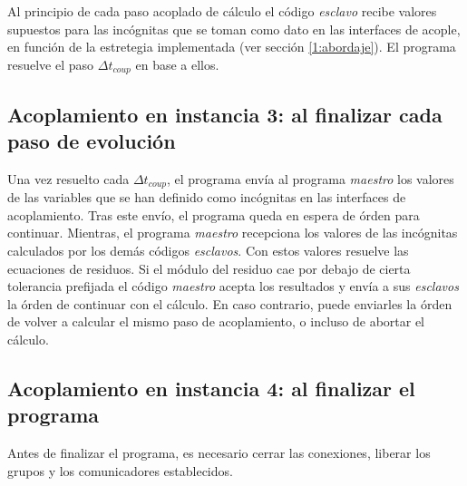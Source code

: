 Al principio de cada paso acoplado de cálculo el código \textit{esclavo} recibe valores supuestos para las incógnitas que se toman como dato en las interfaces de acople,
en función de la estretegia implementada (ver sección \ref{1:abordaje}).
El programa resuelve el paso $\Delta t_{coup}$ en base a ellos.

\subsection*{Acoplamiento en instancia 3: al finalizar cada paso de evolución}

Una vez resuelto cada $\Delta t_{coup}$, el programa envía al programa \textit{maestro} los valores de las variables que se han definido como incógnitas en las interfaces de acoplamiento.
Tras este envío, el programa queda en espera de órden para continuar.
Mientras, el programa \textit{maestro} recepciona los valores de las incógnitas calculados por los demás códigos \textit{esclavos}.
Con estos valores resuelve las ecuaciones de residuos.
Si el módulo del residuo cae por debajo de cierta tolerancia prefijada el código \textit{maestro} acepta los resultados y envía a sus \textit{esclavos} la órden de continuar con el cálculo.
En caso contrario, puede enviarles la órden de volver a calcular el mismo paso de acoplamiento, o incluso de abortar el cálculo.

\subsection*{Acoplamiento en instancia 4: al finalizar el programa}

Antes de finalizar el programa, es necesario cerrar las conexiones, liberar los grupos y los comunicadores establecidos.
